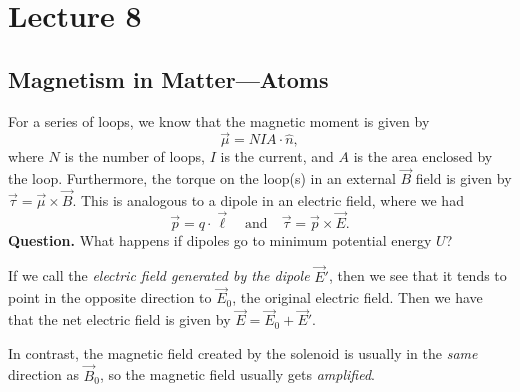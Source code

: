 \documentclass[class=article, crop=false]{standalone}
\begin{document}
  \section{Lecture 8}
  \subsection{Magnetism in Matter---Atoms}
  For a series of loops, we know that the magnetic moment is given by
  \[
    \vec{\mu} = NIA\cdot \hat{n},
  \]
  where $N$ is the number of loops, $I$ is the current, and $A$ is the area enclosed by the loop. Furthermore, the torque on the loop(s) in an external $\vec{B}$ field is given by $\vec{\tau}=\vec{\mu}\times \vec{B}$. This is analogous to a dipole in an electric field, where we had
  \[
    \vec{p} = q\cdot \vec{\ell}\quad \text{and} \quad \vec{\tau} = \vec{p}\times \vec{E}.
  \]
  \textbf{Question.} What happens if dipoles go to minimum potential energy $U$? \par
  If we call the \emph{electric field generated by the dipole} $\vec{E}'$, then we see that it tends to point in the opposite direction to $\vec{E}_0$, the original electric field. Then we have that the net electric field is given by $\vec{E} = \vec{E}_0 + \vec{E}'$. \par
  In contrast, the magnetic field created by the solenoid is usually in the \emph{same} direction as $\vec{B}_0$, so the magnetic field usually gets \emph{amplified}.
\end{document}
